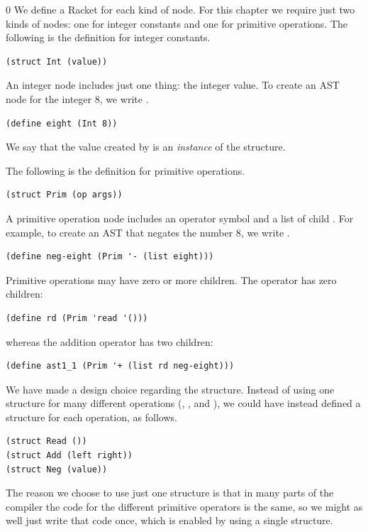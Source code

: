 \documentclass[7x10,nocrop]{TimesAPriori_MIT}%
\def\racketEd{0}
\def\edition{1}
\begin{document}
{\if\edition\racketEd
We define a Racket  for each kind of node.  For this
chapter we require just two kinds of nodes: one for integer constants
and one for primitive operations.  The following is the 
definition for integer constants.
\begin{lstlisting}
(struct Int (value))
\end{lstlisting}
An integer node includes just one thing: the integer value.
To create an AST node for the integer $8$, we write .
\begin{lstlisting}
(define eight (Int 8))
\end{lstlisting}
We say that the value created by  is an
\emph{instance} of the
 structure.

The following is the  definition for primitive operations.
\begin{lstlisting}
(struct Prim (op args))
\end{lstlisting}
A primitive operation node includes an operator symbol  and a
list of child . For example, to create an AST that negates
the number $8$, we write .
\begin{lstlisting}
(define neg-eight (Prim '- (list eight)))
\end{lstlisting}
Primitive operations may have zero or more children. The 
operator has zero children:
\begin{lstlisting}
(define rd (Prim 'read '()))
\end{lstlisting}
whereas the addition operator has two children:
\begin{lstlisting}
(define ast1_1 (Prim '+ (list rd neg-eight)))
\end{lstlisting}

We have made a design choice regarding the  structure.
Instead of using one structure for many different operations
(, \code{+}, and \code{-}), we could have instead defined a
structure for each operation, as follows.
\begin{lstlisting}
(struct Read ())
(struct Add (left right))
(struct Neg (value))
\end{lstlisting}
The reason we choose to use just one structure is that in many parts
of the compiler the code for the different primitive operators is the
same, so we might as well just write that code once, which is enabled
by using a single structure.
\fi}
\end{document}
